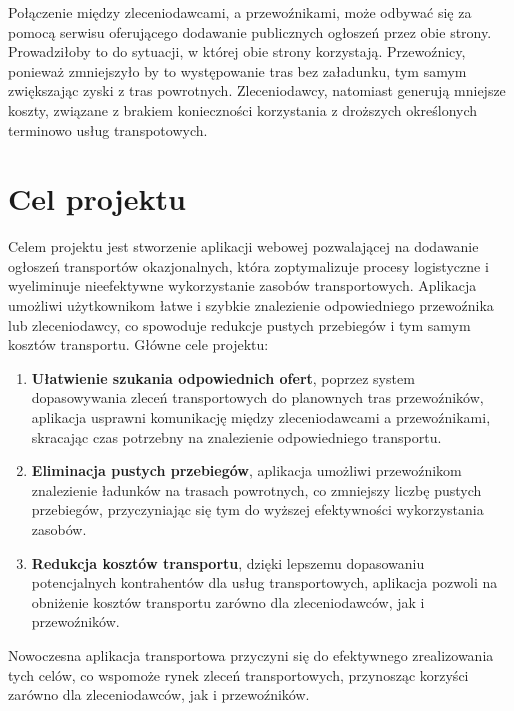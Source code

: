 Połączenie między zleceniodawcami, a przewoźnikami, może odbywać się za pomocą serwisu oferującego dodawanie publicznych ogłoszeń przez obie strony. Prowadziłoby to do sytuacji, w której obie strony korzystają. Przewoźnicy, ponieważ zmniejszyło by to występowanie tras bez załadunku, tym samym zwiększając zyski z tras powrotnych. Zleceniodawcy, natomiast generują mniejsze koszty, związane z brakiem konieczności korzystania z droższych określonych terminowo usług transpotowych.

\label{sec:cele}
\section{Cel projektu}
Celem projektu jest stworzenie aplikacji webowej pozwalającej na dodawanie ogłoszeń transportów okazjonalnych, która zoptymalizuje procesy logistyczne i wyeliminuje nieefektywne wykorzystanie zasobów transportowych. Aplikacja umożliwi użytkownikom łatwe i szybkie znalezienie odpowiedniego przewoźnika lub zleceniodawcy, co spowoduje redukcje pustych przebiegów i tym samym kosztów transportu.
Główne cele projektu:
\begin{enumerate}
    \item \textbf{Ułatwienie szukania odpowiednich ofert}, poprzez system dopasowywania zleceń transportowych do planownych tras przewoźników, aplikacja usprawni komunikację między zleceniodawcami a przewoźnikami, skracając czas potrzebny na znalezienie odpowiedniego transportu.
    \item \textbf{Eliminacja pustych przebiegów}, aplikacja umożliwi przewoźnikom znalezienie ładunków na trasach powrotnych, co zmniejszy liczbę pustych przebiegów, przyczyniając się tym do wyższej efektywności wykorzystania zasobów.
    \item \textbf{Redukcja kosztów transportu}, dzięki lepszemu dopasowaniu potencjalnych kontrahentów dla usług transportowych, aplikacja pozwoli na obniżenie kosztów transportu zarówno dla zleceniodawców, jak i przewoźników.
\end{enumerate}
Nowoczesna aplikacja transportowa przyczyni się do efektywnego zrealizowania tych celów, co wspomoże rynek zleceń transportowych, przynosząc korzyści zarówno dla zleceniodawców, jak i przewoźników.

